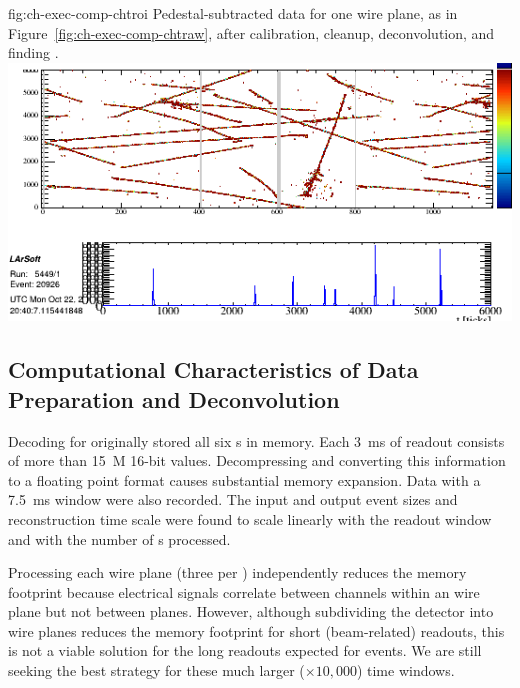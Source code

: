 \begin{dunefigure}
{fig:ch-exec-comp-chtroi}
{Pedestal-subtracted data for one  wire plane, as in Figure~\ref{fig:ch-exec-comp-chtraw}, after calibration, cleanup, deconvolution, and finding .}
 \includegraphics[width=\textwidth]{graphics/comp-evd_twq-proj_5449_20926_decon.png}
\end{dunefigure}


\subsection{Computational Characteristics of Data Preparation and Deconvolution }

Decoding for  originally stored all six s in memory. Each \SI{3}{ms} of  readout consists of more than \SI{15}{M} 16-bit values. Decompressing and converting this information to a floating point format causes substantial memory expansion. 
  Data with a \SI{7.5}{ms} window were also recorded. 
The input and output event sizes and reconstruction time scale were found to scale linearly with the readout window and with the number of s processed. 

Processing each wire plane (three per ) independently reduces the memory footprint because electrical signals correlate between channels within an  wire plane but not between planes.
However,  although subdividing the detector into wire planes reduces the memory footprint for short (beam-related) readouts, this is  not a viable solution for the long readouts expected for  events. We are still seeking the best strategy for these much larger ($\times 10,000$) time windows. 

